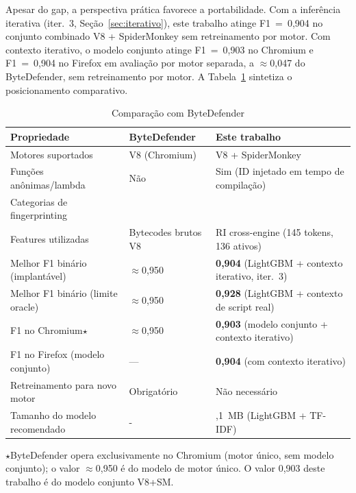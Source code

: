 Apesar do gap, a perspectiva prática favorece a portabilidade. Com a inferência
iterativa (iter.~3, Seção~\ref{sec:iterativo}), este trabalho atinge
F1~=~0,904 no conjunto combinado V8 + SpiderMonkey sem retreinamento por motor.
Com contexto iterativo, o modelo conjunto atinge F1~=~0,903 no Chromium e
F1~=~0,904 no Firefox em avaliação por motor separada, a $\approx$0,047 do
ByteDefender, sem retreinamento por motor. A
Tabela~\ref{tab:bytedefender} sintetiza o posicionamento comparativo.

\begin{table}[htb]
\centering
\caption{Comparação com ByteDefender}
\label{tab:bytedefender}
\begin{tabularx}{\linewidth}{l>{\raggedright\arraybackslash}X>{\raggedright\arraybackslash}X}
\toprule
\textbf{Propriedade} & \textbf{ByteDefender} & \textbf{Este trabalho} \\
\midrule
Motores suportados                & V8 (Chromium)   & V8 + SpiderMonkey \\
Funções anônimas/lambda           & Não             & Sim (ID injetado em tempo de compilação) \\
Categorias de fingerprinting      & 4               & 7 \\
Features utilizadas               & Bytecodes brutos V8 & RI cross-engine (145 tokens, 136 ativos) \\
Melhor F1 binário (implantável)   & $\approx$0,950  & \textbf{0,904} (LightGBM + contexto iterativo, iter.\ 3) \\
Melhor F1 binário (limite oracle) & $\approx$0,950  & \textbf{0,928} (LightGBM + contexto de script real) \\
F1 no Chromium$\star$              & $\approx$0,950  & \textbf{0,903} (modelo conjunto + contexto iterativo) \\
F1 no Firefox (modelo conjunto)   & ---             & \textbf{0,904} (com contexto iterativo) \\
Retreinamento para novo motor     & Obrigatório     & Não necessário \\
Tamanho do modelo recomendado     & -               & 7,1~MB (LightGBM + TF-IDF) \\
\bottomrule
\end{tabularx}
{\footnotesize $\star$ByteDefender opera exclusivamente no Chromium (motor único, sem modelo conjunto);
o valor $\approx$0,950 é do modelo de motor único. O valor 0,903 deste trabalho é do modelo conjunto V8+SM.}

\end{table}

